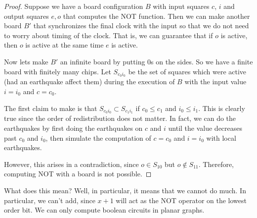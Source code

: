 \documentclass[runningheads,a4paper]{llncs}
\begin{document}
\begin{proof}
Suppose we have a board configuration $B$ with input squares $c$, $i$ and output squares $e, o$ that computes the NOT function. Then we can make another board $B'$ that synchronizes the final clock with the input so that we do not need to worry about timing of the clock. That is, we can guarantee that if $o$ is active, then $o$ is active at the same time $e$ is active.

Now lets make $B'$ an infinite board by putting 0s on the sides. So we have a finite board with finitely many chips. Let $S_{c_0i_0}$ be the set of squares which were active (had an earthquake affect them) during the execution of $B$ with the input value $i = i_0$ and $c = c_0$. 

The first claim to make is that $S_{c_0i_0} \subset S_{c_1i_1}$ if $c_0 \leq c_1$ and $i_0 \leq i_1$. This is clearly true since the order of redistribution does not matter. In fact, we can do the earthquakes by first doing the earthquakes on $c$ and $i$ until the value decreases past $c_0$ and $i_0$, then simulate the computation of $c = c_0$ and $i = i_0$ with local earthquakes.

However, this arises in a contradiction, since $o \in S_{10}$ but $o \notin S_{11}$. Therefore, computing NOT with a board is not possible.
\end{proof}

What does this mean? Well, in particular, it means that we cannot do much. In particular, we can't add, since $x + 1$ will act as the NOT operator on the lowest order bit. We can only compute boolean circuits in planar graphs. 
\end{document}
